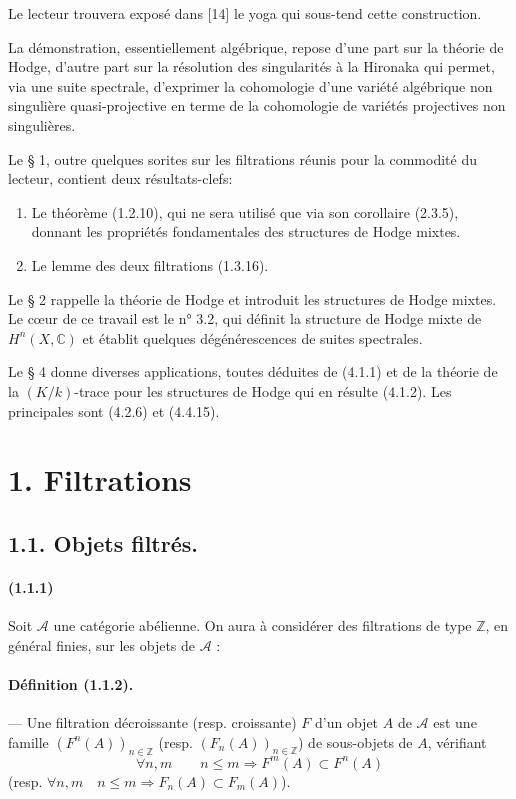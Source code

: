 \documentclass[10pt]{article}
\newcommand{\C}{\mathbb C}
\newcommand{\Z}{\mathbb Z}
\newcommand{\fg}{\guillemotright}
\newcommand{\og}{\guillemotleft}
\newcommand{\calA}{\mathcal A}
\begin{document}
Le lecteur trouvera exposé dans [14] le yoga qui sous-tend cette construction.

La démonstration, essentiellement algébrique, repose d'une part sur la théorie de Hodge, d'autre part sur la résolution des singularités à la Hironaka qui permet, via une suite spectrale, \og d'exprimer\fg{} la cohomologie d'une variété algébrique non singulière quasi-projective en terme de la cohomologie de variétés projectives non singulières.

Le § 1, outre quelques sorites sur les filtrations réunis pour la commodité du lecteur, contient deux résultats-clefs:
\begin{enumerate}[label=\alph*)]
\item Le théorème (1.2.10), qui ne sera utilisé que via son corollaire (2.3.5), donnant les propriétés fondamentales des \og structures de Hodge mixtes\fg{}.
\item Le \og lemme des deux filtrations\fg{} (1.3.16).
\end{enumerate}
Le § 2 rappelle la théorie de Hodge et introduit les structures de Hodge mixtes. Le cœur de ce travail est le n° 3.2, qui définit la structure de Hodge mixte de $H^n(X,\C)$ et établit quelques dégénérescences de suites spectrales.

Le § 4 donne diverses applications, toutes déduites de (4.1.1) et de la théorie de la $(K/k)$-trace pour les structures de Hodge qui en résulte (4.1.2). Les principales sont (4.2.6) et (4.4.15).

\section*{1. Filtrations}
\subsection*{1.1. Objets filtrés.}

\paragraph{(1.1.1)} Soit $\calA$ une catégorie abélienne. On aura à considérer des filtrations de type $\Z$, en général finies, sur les objets de $\calA$ :

\paragraph{Définition (1.1.2).} --- Une filtration décroissante (resp. croissante) $F$ d'un objet $A$ de $\calA$ est une famille $(F^n(A))_{n\in\Z}$ (resp. $(F_n(A))_{n\in\Z}$) de sous-objets de $A$, vérifiant
\[
\forall n,m\qquad n\le m\Rightarrow F^m(A)\subset F^n(A)
\]
(resp. $\forall n,m\quad n\le m\Rightarrow F_n(A)\subset F_m(A)$).
\end{document}
